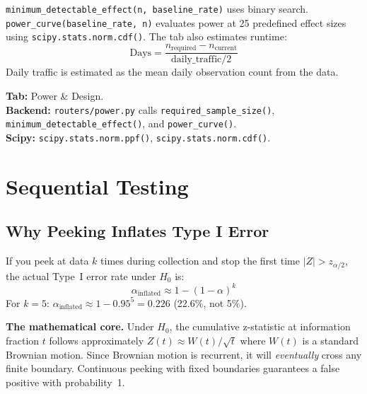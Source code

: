 \documentclass[11pt,a4paper]{article}
\newcommand{\code}[1]{\texttt{#1}}
\newcommand{\scipy}[1]{\texttt{scipy.stats.#1}}
\begin{document}
\vspace{8pt}

\begin{application}
\code{minimum\_detectable\_effect(n, baseline\_rate)} uses binary search. \code{power\_curve(baseline\_rate, n)} evaluates power at 25 predefined effect sizes using \scipy{norm.cdf()}. The tab also estimates runtime:
\[
\text{Days} = \frac{n_{\mathrm{required}} - n_{\mathrm{current}}}{\text{daily\_traffic} / 2}
\]
Daily traffic is estimated as the mean daily observation count from the data.
\end{application}

\vspace{8pt}

\begin{dashlink}
\textbf{Tab:} Power \& Design.\\
\textbf{Backend:} \code{routers/power.py} calls \code{required\_sample\_size()}, \code{minimum\_detectable\_effect()}, and \code{power\_curve()}.\\
\textbf{Scipy:} \code{scipy.stats.norm.ppf()}, \code{scipy.stats.norm.cdf()}.
\end{dashlink}


\section{Sequential Testing}
\label{sec:sequential}

\subsection{Why Peeking Inflates Type I Error}

\begin{formaldef}
If you peek at data $k$ times during collection and stop the first time $|Z| > z_{\alpha/2}$, the actual Type~I error rate under $H_0$ is:
\[
\alpha_{\mathrm{inflated}} \approx 1 - (1 - \alpha)^k
\]
For $k = 5$: $\alpha_{\mathrm{inflated}} \approx 1 - 0.95^5 = 0.226$ (22.6\%, not 5\%).

\medskip
\textbf{The mathematical core.} Under $H_0$, the cumulative z-statistic at information fraction $t$ follows approximately $Z(t) \approx W(t)/\sqrt{t}$ where $W(t)$ is a standard Brownian motion. Since Brownian motion is recurrent, it will \emph{eventually} cross any finite boundary. Continuous peeking with fixed boundaries guarantees a false positive with probability~1.
\end{formaldef}
\end{document}
